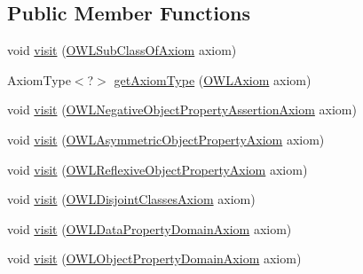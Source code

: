 \subsection*{Public Member Functions}
\begin{DoxyCompactItemize}
\item 
void \hyperlink{classorg_1_1semanticweb_1_1owlapi_1_1util_1_1_axiom_type_provider_a74364a02b310ff0060056ec7e07b47b4}{visit} (\hyperlink{interfaceorg_1_1semanticweb_1_1owlapi_1_1model_1_1_o_w_l_sub_class_of_axiom}{O\-W\-L\-Sub\-Class\-Of\-Axiom} axiom)
\item 
Axiom\-Type$<$?$>$ \hyperlink{classorg_1_1semanticweb_1_1owlapi_1_1util_1_1_axiom_type_provider_a84046a882fe5d4151627cd8423347a65}{get\-Axiom\-Type} (\hyperlink{interfaceorg_1_1semanticweb_1_1owlapi_1_1model_1_1_o_w_l_axiom}{O\-W\-L\-Axiom} axiom)
\item 
void \hyperlink{classorg_1_1semanticweb_1_1owlapi_1_1util_1_1_axiom_type_provider_a9cd636c0864da212688a020413f23444}{visit} (\hyperlink{interfaceorg_1_1semanticweb_1_1owlapi_1_1model_1_1_o_w_l_negative_object_property_assertion_axiom}{O\-W\-L\-Negative\-Object\-Property\-Assertion\-Axiom} axiom)
\item 
void \hyperlink{classorg_1_1semanticweb_1_1owlapi_1_1util_1_1_axiom_type_provider_a0ae3d640bae92ceeeed9b914d511e7a1}{visit} (\hyperlink{interfaceorg_1_1semanticweb_1_1owlapi_1_1model_1_1_o_w_l_asymmetric_object_property_axiom}{O\-W\-L\-Asymmetric\-Object\-Property\-Axiom} axiom)
\item 
void \hyperlink{classorg_1_1semanticweb_1_1owlapi_1_1util_1_1_axiom_type_provider_a8e987b6d2198dfc5c70b0bafca54c3b6}{visit} (\hyperlink{interfaceorg_1_1semanticweb_1_1owlapi_1_1model_1_1_o_w_l_reflexive_object_property_axiom}{O\-W\-L\-Reflexive\-Object\-Property\-Axiom} axiom)
\item 
void \hyperlink{classorg_1_1semanticweb_1_1owlapi_1_1util_1_1_axiom_type_provider_a19cfb91fe30eeba9ba139159f04f887a}{visit} (\hyperlink{interfaceorg_1_1semanticweb_1_1owlapi_1_1model_1_1_o_w_l_disjoint_classes_axiom}{O\-W\-L\-Disjoint\-Classes\-Axiom} axiom)
\item 
void \hyperlink{classorg_1_1semanticweb_1_1owlapi_1_1util_1_1_axiom_type_provider_a55624f5ff864ecb987600d500ceadeae}{visit} (\hyperlink{interfaceorg_1_1semanticweb_1_1owlapi_1_1model_1_1_o_w_l_data_property_domain_axiom}{O\-W\-L\-Data\-Property\-Domain\-Axiom} axiom)
\item 
void \hyperlink{classorg_1_1semanticweb_1_1owlapi_1_1util_1_1_axiom_type_provider_a830a8cb3253cca1b8fed641eb2310102}{visit} (\hyperlink{interfaceorg_1_1semanticweb_1_1owlapi_1_1model_1_1_o_w_l_object_property_domain_axiom}{O\-W\-L\-Object\-Property\-Domain\-Axiom} axiom)

\end{DoxyCompactItemize}
